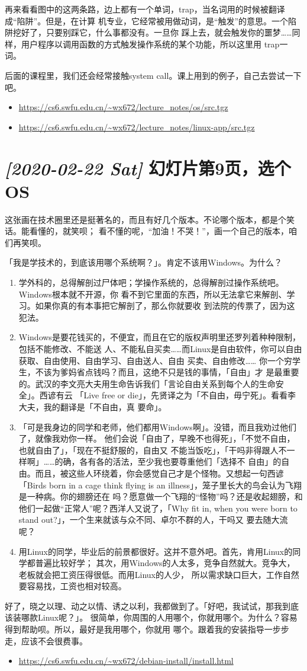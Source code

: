\documentclass{wx672ctexart} [NO-DEFAULT-PACKAGES] \usepackage{wx672hyperref}
\begin{document}
再来看看图中的这两条路，边上都有一个单词，trap，当名词用的时候被翻译成“陷阱”。但是，在计算
机专业，它经常被用做动词，是“触发”的意思。一个陷阱挖好了，只要别踩它，什么事都没有。一旦你
踩上去，就会触发你的噩梦……同样，用户程序以调用函数的方式触发操作系统的某个功能，所以这里用
trap一词。

后面的课程里，我们还会经常接触system call。课上用到的例子，自己去尝试一下吧。
\begin{itemize}
\item \url{https://cs6.swfu.edu.cn/\~wx672/lecture\_notes/os/src.tgz}
\item \url{https://cs6.swfu.edu.cn/\~wx672/lecture\_notes/linux-app/src.tgz}
\end{itemize}

\section{\textit{[2020-02-22 Sat] } 幻灯片第9页，选个OS}
\label{sec:orgf1caf62}

这张画在技术圈里还是挺著名的，而且有好几个版本。不论哪个版本，都是个笑话。能看懂的，就笑呗；
看不懂的呢，“加油！不哭！”，画一个自己的版本，咱们再笑呗。

「我是学技术的，到底该用哪个系统啊？」。肯定不该用Windows。为什么？
\begin{enumerate}
\item 学外科的，总得解剖过尸体吧；学操作系统的，总得解剖过操作系统吧。Windows根本就不开源，你
看不到它里面的东西，所以无法拿它来解剖、学习。如果你真的有本事把它解剖了，那么你就要收
到法院的传票了，因为这犯法。
\item Windows是要花钱买的，不便宜，而且在它的版权声明里还罗列着种种限制，包括不能修改、不能送
人、不能私自买卖……而Linux是自由软件，你可以自由获取、自由使用、自由学习、自由送人、自由
买卖、自由修改…… 你一个穷学生，不该为爹妈省点钱吗？而且，这绝不只是钱的事情，「自由」才
是最重要的。武汉的李文亮大夫用生命告诉我们「言论自由关系到每个人的生命安全」。西谚有云
「Live free or die」，先贤译之为「不自由，毋宁死」。看看李大夫，我的翻译是「不自由，真
要命」。
\item 「可是我身边的同学和老师，他们都用Windows啊」。没错，而且我劝过他们了，就像我劝你一样。
他们会说「自由了，早晚不也得死」，「不觉不自由，也就自由了」，「现在不挺舒服的，自由又
不能当饭吃」，「干吗非得跟人不一样啊」……的确，各有各的活法，至少我也要尊重他们「选择不
自由」的自由。而且，被这些人环绕着，你会感觉自己才是个怪物。又想起一句西谚「Birds born
in a cage think flying is an illness」，笼子里长大的鸟会认为飞翔是一种病。你的翅膀还在
吗？愿意做一个飞翔的“怪物”吗？还是收起翅膀，和他们一起做“正常人”呢？西洋人又说了，「Why
fit in, when you were born to stand out?」，一个生来就该与众不同、卓尔不群的人，干吗又
要去随大流呢？
\item 用Linux的同学，毕业后的前景都很好。这并不意外吧。首先，肯用Linux的同学都普遍比较好学；
其次，用Windows的人太多，竞争自然就大。竞争大，老板就会把工资压得很低。而用Linux的人少，
所以需求缺口巨大，工作自然要容易找，工资也相对较高。
\end{enumerate}

好了，晓之以理、动之以情、诱之以利，我都做到了。「好吧，我试试，那我到底该装哪款Linux呢？」。
很简单，你周围的人用哪个，你就用哪个。为什么？容易得到帮助呗。所以，最好是我用哪个，你就用
哪个。跟着我的安装指导一步步走，应该不会很费事。
\begin{itemize}
\item \url{https://cs6.swfu.edu.cn/\~wx672/debian-install/install.html}
\end{itemize}
\end{document}
